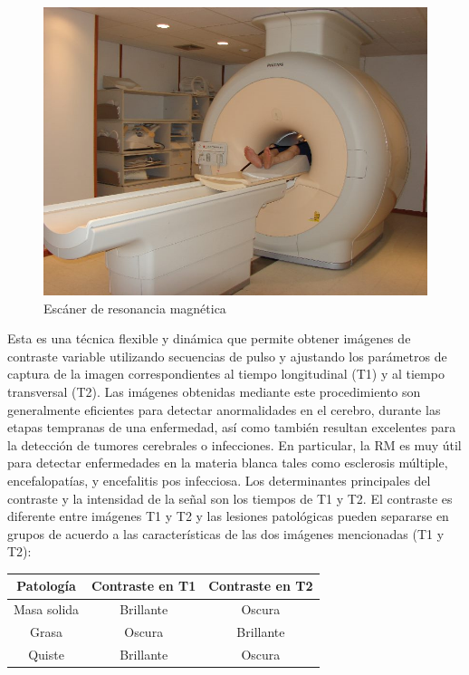 \begin{figure}[H]
\centering
\includegraphics[scale=0.3]{images/scanner.jpg}
\caption{Escáner de resonancia magnética}
\label{fig:scanner:mri}
\end{figure}

Esta es una técnica flexible y dinámica que permite obtener imágenes de contraste variable utilizando secuencias de pulso y ajustando los parámetros de captura de la imagen correspondientes al tiempo longitudinal (T1) y al tiempo transversal (T2). Las imágenes obtenidas mediante este procedimiento son generalmente eficientes para detectar anormalidades en el cerebro, durante las etapas tempranas de una enfermedad, así como también resultan excelentes para la detección de tumores cerebrales o infecciones. En particular, la RM es muy útil para detectar enfermedades en la materia blanca tales como esclerosis múltiple, encefalopatías, y encefalitis pos infecciosa. Los determinantes principales del contraste y la intensidad de la señal son los tiempos de T1 y T2. El contraste es diferente entre imágenes T1 y T2 y las lesiones patológicas pueden separarse en grupos de acuerdo a las características de las dos imágenes mencionadas (T1 y T2):


\begin{table}[H]
	\centering
	\begin{tabular}{c|c c}
	Patología & Contraste en T1 & Contraste en T2   \\ 
	\hline Masa solida & Brillante & Oscura  \\ 
	Grasa & Oscura & Brillante  \\ 
	Quiste &	Brillante &	Oscura  \\ 
	\end{tabular} 
\end{table}

